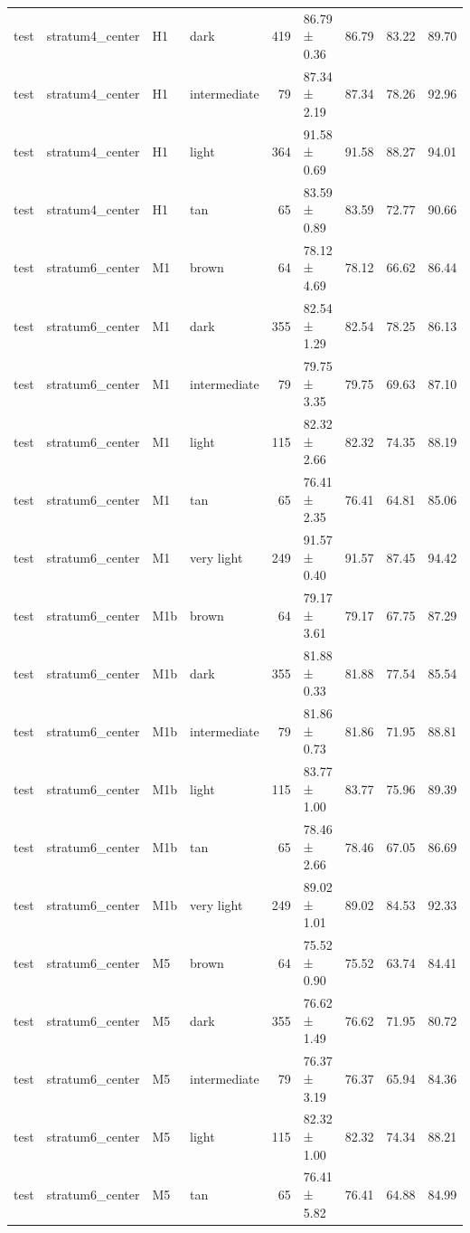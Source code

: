\begin{tabular}{llllrlrrr}
test & stratum4\_center & H1 & dark & 419 & 86.79 ± 0.36 & 86.79 & 83.22 & 89.70 \\
test & stratum4\_center & H1 & intermediate & 79 & 87.34 ± 2.19 & 87.34 & 78.26 & 92.96 \\
test & stratum4\_center & H1 & light & 364 & 91.58 ± 0.69 & 91.58 & 88.27 & 94.01 \\
test & stratum4\_center & H1 & tan & 65 & 83.59 ± 0.89 & 83.59 & 72.77 & 90.66 \\
test & stratum6\_center & M1 & brown & 64 & 78.12 ± 4.69 & 78.12 & 66.62 & 86.44 \\
test & stratum6\_center & M1 & dark & 355 & 82.54 ± 1.29 & 82.54 & 78.25 & 86.13 \\
test & stratum6\_center & M1 & intermediate & 79 & 79.75 ± 3.35 & 79.75 & 69.63 & 87.10 \\
test & stratum6\_center & M1 & light & 115 & 82.32 ± 2.66 & 82.32 & 74.35 & 88.19 \\
test & stratum6\_center & M1 & tan & 65 & 76.41 ± 2.35 & 76.41 & 64.81 & 85.06 \\
test & stratum6\_center & M1 & very light & 249 & 91.57 ± 0.40 & 91.57 & 87.45 & 94.42 \\
test & stratum6\_center & M1b & brown & 64 & 79.17 ± 3.61 & 79.17 & 67.75 & 87.29 \\
test & stratum6\_center & M1b & dark & 355 & 81.88 ± 0.33 & 81.88 & 77.54 & 85.54 \\
test & stratum6\_center & M1b & intermediate & 79 & 81.86 ± 0.73 & 81.86 & 71.95 & 88.81 \\
test & stratum6\_center & M1b & light & 115 & 83.77 ± 1.00 & 83.77 & 75.96 & 89.39 \\
test & stratum6\_center & M1b & tan & 65 & 78.46 ± 2.66 & 78.46 & 67.05 & 86.69 \\
test & stratum6\_center & M1b & very light & 249 & 89.02 ± 1.01 & 89.02 & 84.53 & 92.33 \\
test & stratum6\_center & M5 & brown & 64 & 75.52 ± 0.90 & 75.52 & 63.74 & 84.41 \\
test & stratum6\_center & M5 & dark & 355 & 76.62 ± 1.49 & 76.62 & 71.95 & 80.72 \\
test & stratum6\_center & M5 & intermediate & 79 & 76.37 ± 3.19 & 76.37 & 65.94 & 84.36 \\
test & stratum6\_center & M5 & light & 115 & 82.32 ± 1.00 & 82.32 & 74.34 & 88.21 \\
test & stratum6\_center & M5 & tan & 65 & 76.41 ± 5.82 & 76.41 & 64.88 & 84.99 \\

\end{tabular}
